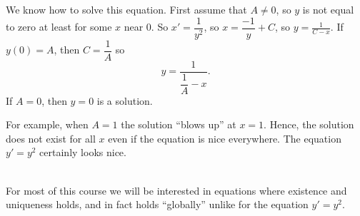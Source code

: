 {
We know how to solve this equation.  First assume that $A \not= 0$,
so $y$ is not equal to zero at least for some $x$ near 0.  So
$x' = \dfrac{1}{y^2}$, so
$x = \dfrac{-1}{y} + C$, so $y = \frac{1}{C-x}$.  If $y(0) = A$, then
$C = \dfrac{1}{A}$ so
\begin{equation*}
y = \frac{1}{\dfrac{1}{A} - x} .
\end{equation*}
If $A=0$, then $y=0$ is a solution.

For example, when $A=1$
the solution ``blows up'' at $x=1$.  Hence, the solution does not exist
for all $x$ even if the equation is nice everywhere.  The equation
$y' = y^2$ certainly
looks nice.
}\\

For most of this
course we will be interested in equations where existence and
uniqueness holds, and in fact holds ``globally'' unlike for the equation
$y'=y^2$.

